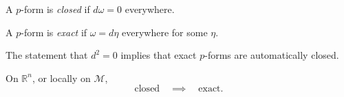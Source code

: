 \begin{definition}[]
  A $p$-form is \emph{closed} if $d\omega =0$ everywhere.
\end{definition}
\begin{definition}[]
  A $p$-form is \emph{exact} if $\omega = d\eta$ everywhere for some $\eta$.
\end{definition}
\begin{corollary}
  The statement that $d^2 = 0$ implies that exact $p$-forms are automatically closed.
\end{corollary}

\begin{lemma}
  On $\mathbb{R}^n$, or locally on $\mathcal{M}$, 
  \begin{equation}
    \text{closed} \quad \implies \quad \text{exact}.
  \end{equation}
\end{lemma}
